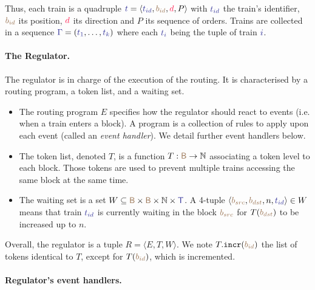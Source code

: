 \documentclass[runningheads]{llncs}
\newcommand{\Nat}{{\mbox{$\mathbb{N}$}}}
\newcommand{\tuple}[1]{\ensuremath{\langle #1\rangle}}
\newcommand{\dirFmt}[1]{{\color{dircolor} #1}}
\newcommand{\posFmt}[1]{{\color{poscolor}{#1}}}
\newcommand{\blocks}{{\posFmt{\mathsf{B}}}}
\newcommand{\bid}[1]{\ensuremath{\posFmt{b_{#1}}}}
\newcommand{\trainFmt}[1]{{\color{traincolor} #1}}
\newcommand{\trainTuple}[4]{\langle \trainFmt{#1}, \posFmt{#2}, \dirFmt{#3}, #4 \rangle}
\newcommand{\trainSeq}{\ensuremath{\trainFmt{\Gamma}}\xspace}
\newcommand{\trains}{{\trainFmt{\mathsf{T}}}}
\newcommand{\tid}[1]{\ensuremath{\trainFmt{t_{#1}}}}
\newcommand{\regTuple}[3]{\tuple{#1, #2, #3}}
\newcommand{\tokens}{\ensuremath{T}}
\newcommand{\tokenOf}[1]{\ensuremath{T(\posFmt{#1})}}
\newcommand{\incrToken}[2]{\ensuremath{#1. {\tt incr}(\posFmt{#2})}}
\begin{document}
Thus, each train is a quadruple $\trainFmt{t} = \trainTuple{\tid{id}}{\bid{id}}{d}{P}$ with $\tid{id}$ the train's identifier, $\bid{id}$ its position, $\dirFmt{d}$ its direction and $P$ its sequence of orders. Trains are collected in a sequence $\trainSeq = (\trainFmt{t_1}, \ldots, \trainFmt{t_k})$ where each $\trainFmt{t_i}$ being the tuple of train $\trainFmt{i}$. 


\paragraph{The Regulator.}
The regulator is in charge of the execution of the routing.
It is characterised by a routing program, a token list, and a waiting set.

\begin{itemize}
	\item The routing program $E$ specifies how the regulator should react to events (i.e. when a train enters a block). A program is a collection of rules to apply upon each event (called an \emph{event handler}). We detail further event handlers below.
	\item The token list, denoted $\tokens$, is a function  $\tokens: \blocks \to \Nat$ associating a token level to each block. Those tokens are used to prevent multiple trains accessing the same block at the same time.
	\item The waiting set is a set $W \subseteq \blocks \times \blocks \times \Nat \times \trains$. A 4-tuple $\tuple{\bid{src}, \bid{dst}, n, \tid{id}} \in W$ means that train \tid{id} is currently waiting in the block \bid{src} for $\tokenOf{\bid{dst}}$ to be increased up to $n$.
\end{itemize}

Overall, the regulator is a tuple $R = \regTuple{E}{\tokens}{W}$. We note $\incrToken{T}{\bid{id}}$ the list of tokens identical to $T$, except for $\tokenOf{\bid{id}}$, which is incremented.

\paragraph{Regulator's event handlers.}
\end{document}
